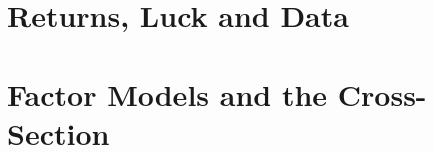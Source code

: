 \documentclass[12pt]{Beautybook-EN}
\begin{document}




\part{Returns, Luck and Data}

\part{Factor Models and the Cross-Section}
  
  



\end{document}
